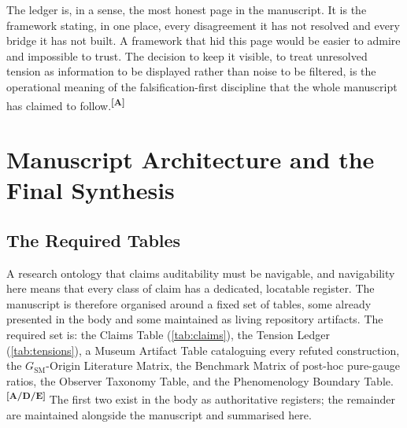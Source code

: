 \documentclass[12pt,a4paper,twoside]{article}
\theoremstyle{plain}
\theoremstyle{definition}
\theoremstyle{remark}
\newcommand{\catmark}[1]{\textsuperscript{\textsf{\textbf{[#1]}}}}
\begin{document}
The ledger is, in a sense, the most honest page in the manuscript. It is the framework stating, in one place, every disagreement it has not resolved and every bridge it has not built. A framework that hid this page would be easier to admire and impossible to trust. The decision to keep it visible, to treat unresolved tension as information to be displayed rather than noise to be filtered, is the operational meaning of the falsification-first discipline that the whole manuscript has claimed to follow.\catmark{A}


\section{Manuscript Architecture and the Final Synthesis}
\label{sec:final-synthesis}

\subsection{The Required Tables}
\label{subsec:required-tables}

A research ontology that claims auditability must be navigable, and navigability here means that every class of claim has a dedicated, locatable register. The manuscript is therefore organised around a fixed set of tables, some already presented in the body and some maintained as living repository artifacts. The required set is: the Claims Table (\cref{tab:claims}), the Tension Ledger (\cref{tab:tensions}), a Museum Artifact Table cataloguing every refuted construction, the $G_{\mathrm{SM}}$-Origin Literature Matrix, the Benchmark Matrix of post-hoc pure-gauge ratios, the Observer Taxonomy Table, and the Phenomenology Boundary Table.\catmark{A/D/E} The first two exist in the body as authoritative registers; the remainder are maintained alongside the manuscript and summarised here.
\end{document}
